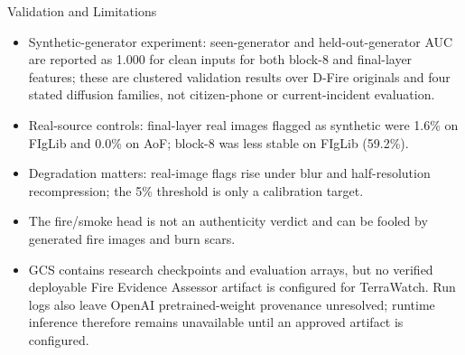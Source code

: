 \documentclass[aspectratio=169,10pt]{beamer}
\begin{document}
\begin{frame}{Validation and Limitations}
  \begin{itemize}
    \item Synthetic-generator experiment: seen-generator and held-out-generator AUC are reported as 1.000 for clean inputs for both block-8 and final-layer features; these are clustered validation results over D-Fire originals and four stated diffusion families, not citizen-phone or current-incident evaluation.
    \item Real-source controls: final-layer real images flagged as synthetic were 1.6\% on FIgLib and 0.0\% on AoF; block-8 was less stable on FIgLib (59.2\%).
    \item Degradation matters: real-image flags rise under blur and half-resolution recompression; the 5\% threshold is only a calibration target.
    \item The fire/smoke head is not an authenticity verdict and can be fooled by generated fire images and burn scars.
    \item GCS contains research checkpoints and evaluation arrays, but no verified deployable Fire Evidence Assessor artifact is configured for TerraWatch. Run logs also leave OpenAI pretrained-weight provenance unresolved; runtime inference therefore remains unavailable until an approved artifact is configured.
  \end{itemize}
\end{frame}
\end{document}
